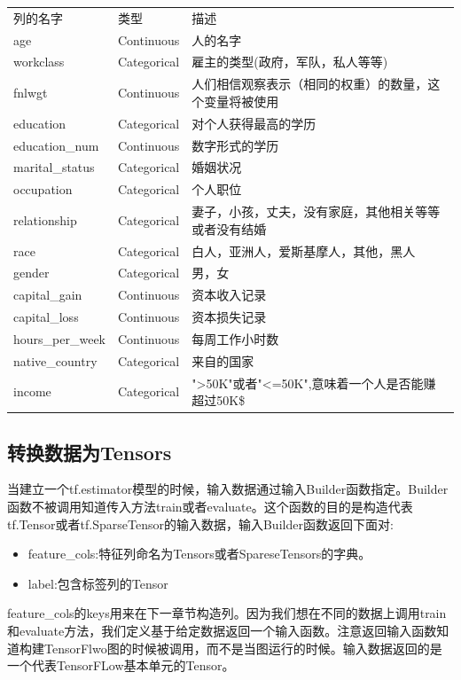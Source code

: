 \begin{tabular}{ |p{1cm}||p{1cm}|p{8cm}|}
列的名字&类型&描述\\
age&Continuous&人的名字\\
workclass&  Categorical&雇主的类型(政府，军队，私人等等)\\
fnlwgt& Continuous& 人们相信观察表示（相同的权重）的数量，这个变量将被使用\\
education&  Categorical&对个人获得最高的学历\\
education\_num& Continuous& 数字形式的学历\\
marital\_status&  Categorical&婚姻状况\\
occupation& Categorical&个人职位\\
relationship& Categorical &妻子，小孩，丈夫，没有家庭，其他相关等等或者没有结婚\\
race& Categorical&白人，亚洲人，爱斯基摩人，其他，黑人\\
gender& Categorical&男，女\\
capital\_gain&  Continuous& 资本收入记录\\
capital\_loss&  Continuous& 资本损失记录\\
hours\_per\_week& Continuous& 每周工作小时数\\
native\_country&  Categorical&  来自的国家\\
income& Categorical&">50K"或者"<=50K",意味着一个人是否能赚超过50K\$
\end{tabular}
\subsection{转换数据为Tensors}
当建立一个tf.estimator模型的时候，输入数据通过输入Builder函数指定。Builder函数不被调用知道传入方法train或者evaluate。这个函数的目的是构造代表tf.Tensor或者tf.SparseTensor的输入数据，输入Builder函数返回下面对:
\begin{itemize}
  \item feature\_cols:特征列命名为Tensors或者SpareseTensors的字典。
  \item label:包含标签列的Tensor
\end{itemize}
feature\_cols的keys用来在下一章节构造列。因为我们想在不同的数据上调用train和evaluate方法，我们定义基于给定数据返回一个输入函数。注意返回输入函数知道构建TensorFlwo图的时候被调用，而不是当图运行的时候。输入数据返回的是一个代表TensorFLow基本单元的Tensor。

